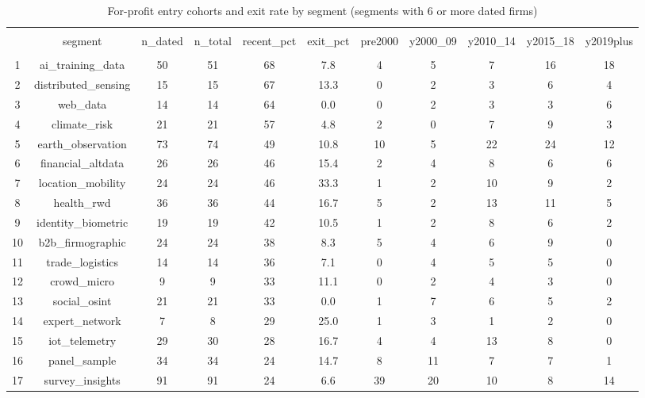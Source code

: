 
\begin{table}[!htbp] \centering 
  \caption{For-profit entry cohorts and exit rate by segment (segments with 6 or more dated firms)} 
  \label{} 
\begin{tabular}{@{\extracolsep{5pt}} ccccccccccc} 
\\[-1.8ex]\hline 
\hline \\[-1.8ex] 
 & segment & n\_dated & n\_total & recent\_pct & exit\_pct & pre2000 & y2000\_09 & y2010\_14 & y2015\_18 & y2019plus \\ 
\hline \\[-1.8ex] 
1 & ai\_training\_data &  50 &  51 & 68 &  7.8 &  4 &  5 &  7 & 16 & 18 \\ 
2 & distributed\_sensing &  15 &  15 & 67 & 13.3 &  0 &  2 &  3 &  6 &  4 \\ 
3 & web\_data &  14 &  14 & 64 &  0.0 &  0 &  2 &  3 &  3 &  6 \\ 
4 & climate\_risk &  21 &  21 & 57 &  4.8 &  2 &  0 &  7 &  9 &  3 \\ 
5 & earth\_observation &  73 &  74 & 49 & 10.8 & 10 &  5 & 22 & 24 & 12 \\ 
6 & financial\_altdata &  26 &  26 & 46 & 15.4 &  2 &  4 &  8 &  6 &  6 \\ 
7 & location\_mobility &  24 &  24 & 46 & 33.3 &  1 &  2 & 10 &  9 &  2 \\ 
8 & health\_rwd &  36 &  36 & 44 & 16.7 &  5 &  2 & 13 & 11 &  5 \\ 
9 & identity\_biometric &  19 &  19 & 42 & 10.5 &  1 &  2 &  8 &  6 &  2 \\ 
10 & b2b\_firmographic &  24 &  24 & 38 &  8.3 &  5 &  4 &  6 &  9 &  0 \\ 
11 & trade\_logistics &  14 &  14 & 36 &  7.1 &  0 &  4 &  5 &  5 &  0 \\ 
12 & crowd\_micro &   9 &   9 & 33 & 11.1 &  0 &  2 &  4 &  3 &  0 \\ 
13 & social\_osint &  21 &  21 & 33 &  0.0 &  1 &  7 &  6 &  5 &  2 \\ 
14 & expert\_network &   7 &   8 & 29 & 25.0 &  1 &  3 &  1 &  2 &  0 \\ 
15 & iot\_telemetry &  29 &  30 & 28 & 16.7 &  4 &  4 & 13 &  8 &  0 \\ 
16 & panel\_sample &  34 &  34 & 24 & 14.7 &  8 & 11 &  7 &  7 &  1 \\ 
17 & survey\_insights &  91 &  91 & 24 &  6.6 & 39 & 20 & 10 &  8 & 14 \\ 

\end{tabular}
\end{table}
